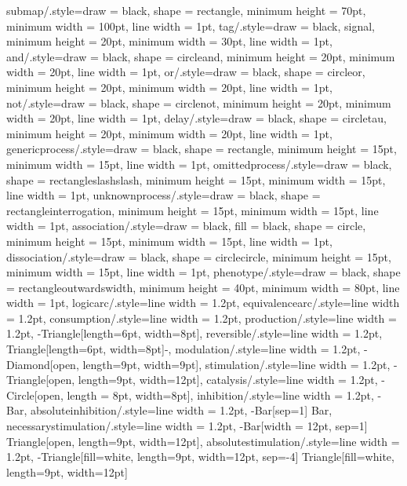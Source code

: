 {    submap/.style={draw = black, shape = rectangle, minimum height = 70pt, minimum width = 100pt, line width = 1pt},
    tag/.style={draw = black, signal, minimum height = 20pt, minimum width = 30pt, line width = 1pt},
    and/.style={draw = black, shape = circleand, minimum height = 20pt, minimum width = 20pt, line width = 1pt},
    or/.style={draw = black, shape = circleor, minimum height = 20pt, minimum width = 20pt, line width = 1pt},
    not/.style={draw = black, shape = circlenot, minimum height = 20pt, minimum width = 20pt, line width = 1pt},
    delay/.style={draw = black, shape = circletau, minimum height = 20pt, minimum width = 20pt, line width = 1pt},
    genericprocess/.style={draw = black, shape = rectangle, minimum height = 15pt, minimum width = 15pt, line width = 1pt},
    omittedprocess/.style={draw = black, shape = rectangleslashslash, minimum height = 15pt, minimum width = 15pt, line width = 1pt},
    unknownprocess/.style={draw = black, shape = rectangleinterrogation, minimum height = 15pt, minimum width = 15pt, line width = 1pt},
    association/.style={draw = black, fill = black, shape = circle, minimum height = 15pt, minimum width = 15pt, line width = 1pt},
    dissociation/.style={draw = black, shape = circlecircle, minimum height = 15pt, minimum width = 15pt, line width = 1pt},
    phenotype/.style={draw = black, shape = rectangleoutwardswidth, minimum height = 40pt, minimum width = 80pt, line width = 1pt},
    logicarc/.style={line width = 1.2pt},
    equivalencearc/.style={line width = 1.2pt},
    consumption/.style={line width = 1.2pt},
    production/.style={line width = 1.2pt, -{Triangle[length=6pt, width=8pt]}},
    reversible/.style={line width = 1.2pt, {Triangle[length=6pt, width=8pt]}-},
    modulation/.style={line width = 1.2pt, -{Diamond[open, length=9pt, width=9pt]}},
    stimulation/.style={line width = 1.2pt, -{Triangle[open, length=9pt, width=12pt]}},
    catalysis/.style={line width = 1.2pt, -{Circle[open, length = 8pt, width=8pt]}},
    inhibition/.style={line width = 1.2pt, -{Bar}},
    absoluteinhibition/.style={line width = 1.2pt, -{Bar[sep=1] Bar}},
    necessarystimulation/.style={line width = 1.2pt, -{Bar[width = 12pt, sep=1] Triangle[open, length=9pt, width=12pt]}},
    absolutestimulation/.style={line width = 1.2pt, -{Triangle[fill=white, length=9pt, width=12pt, sep=-4] Triangle[fill=white, length=9pt, width=12pt]}}}
